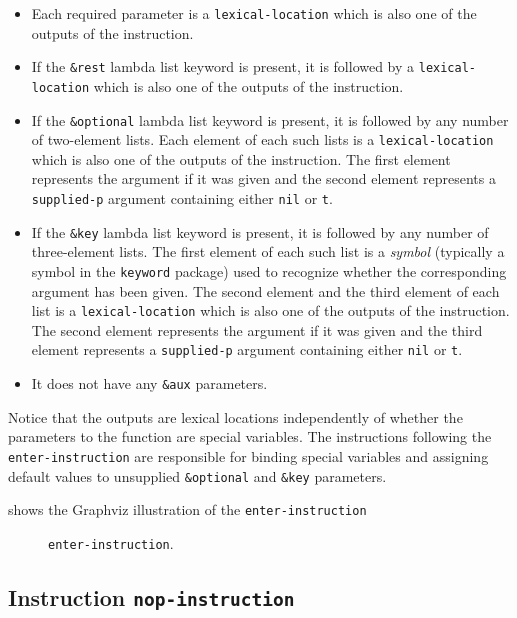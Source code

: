 \begin{itemize}
\item Each required parameter is a \texttt{lexical-location} which is
  also one of the outputs of the instruction.
\item If the \texttt{\&rest} lambda list keyword is present, it is
  followed by a \texttt{lexical-location} which is also one of the
  outputs of the instruction.
\item If the \texttt{\&optional} lambda list keyword is present, it is
  followed by any number of two-element lists.  Each element of each
  such lists is a \texttt{lexical-location} which is also one of the
  outputs of the instruction.  The first element represents the
  argument if it was given and the second element represents a
  \texttt{supplied-p} argument containing either \texttt{nil} or
  \texttt{t}.
\item If the \texttt{\&key} lambda list keyword is present, it is
  followed by any number of three-element lists.  The first element of
  each such list is a \emph{symbol} (typically a symbol in the
  \texttt{keyword} package) used to recognize whether the
  corresponding argument has been given.  The second element and the
  third element of each list is a \texttt{lexical-location} which is
  also one of the outputs of the instruction.  The second element
  represents the argument if it was given and the third element
  represents a \texttt{supplied-p} argument containing either
  \texttt{nil} or \texttt{t}.
\item It does not have any \texttt{\&aux} parameters.
\end{itemize}

Notice that the outputs are lexical locations independently of whether
the parameters to the function are special variables.  The
instructions following the \texttt{enter-instruction} are responsible
for binding special variables and assigning default values to
unsupplied \texttt{\&optional} and \texttt{\&key} parameters.

 shows the Graphviz illustration of the
\texttt{enter-instruction}

\begin{figure}
\begin{center}
\end{center}
\caption{\label{fig-enter-instruction}
\texttt{enter-instruction}.}
\end{figure}

\subsection{Instruction \texttt{nop-instruction}}
\label{mir-instruction-nop}

